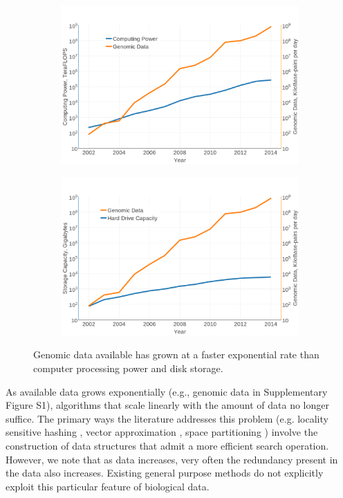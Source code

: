 \documentclass[review,preprint,12pt]{elsarticle}
\renewcommand{\cite}{\citep} %
\theoremstyle{definition}
\theoremstyle{remark}
\numberwithin{equation}{section}
\begin{document}
\begin{figure}[tbp]
    \centering
    \begin{subfigure}[b]{0.49\textwidth}
        \includegraphics[width=1\textwidth]{assets/computeVsData}
        \caption{}
    \end{subfigure}%
    \begin{subfigure}[b]{0.49\textwidth}
        \includegraphics[width=1\textwidth]{assets/storageVsData}
        \caption{}
    \end{subfigure}
    \caption{Genomic data available has grown at a faster exponential rate than computer processing power and disk storage.}
    \label{fig:expdata}
\end{figure}

As available data grows exponentially \cite{berger2013computational,yu2015quality} (e.g., genomic data in Supplementary Figure S1), 
algorithms that scale linearly with the amount of data no longer suffice.
The primary ways the literature addresses this problem (e.g.
locality sensitive hashing \cite{indyk1998approximate}, vector approximation \cite{ferhatosmanoglu2000vector}, space partitioning \cite{weber1998quantitative}) involve the construction of data structures that admit a more efficient search operation.
However, we note that as data increases, very often the redundancy present in the data also increases.
Existing general purpose methods do not explicitly exploit this particular feature of biological data.
\end{document}
